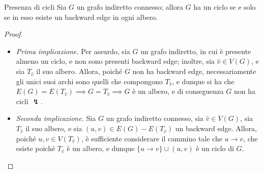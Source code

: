 \documentclass[a4paper, 12pt]{report}
\begin{document}
    \begin{framedthm}{Presenza di cicli}
        Sia $G$ un grafo indiretto connesso; allora $G$ ha un ciclo se e solo se in esso esiste un backward edge in ogni albero.
    \end{framedthm}

    \begin{proof}
        \hspace{0.7cm}
        \begin{itemize}
            \item[] \textit{Prima implicazione.} Per assurdo, sia $G$ un grafo indiretto, in cui è presente almeno un ciclo, e non sono presenti backward edge; inoltre, sia $\hat v \in V(G)$, e sia $T_{\hat v}$ il suo albero. Allora, poiché $G$ non ha backward edge, necessariamente gli unici suoi archi sono quelli che compongono $T_{\hat v}$, e dunque si ha che $E(G) = E(T_{\hat v}) \implies G = T_{\hat v} \implies G$ è un albero, e di conseguenza $G$ non ha cicli $\lightning$.
            \item[] \textit{Seconda implicazione.} Sia $G$ un grafo indiretto connesso, sia $\hat v \in V(G)$, sia $T_{\hat v}$ il suo albero, e sia $(u, v) \in E(G) - E(T_{\hat v})$ un backward edge. Allora, poiché $u, v \in V(T_{\hat v})$, è sufficiente considerare il cammino tale che $u \rightarrow v$, che esiste poiché $T_{\hat v}$ è un albero, e dunque $\{u \rightarrow v\} \cup (u, v)$ è un ciclo di $G$.
        \end{itemize}
    \end{proof}
\end{document}
